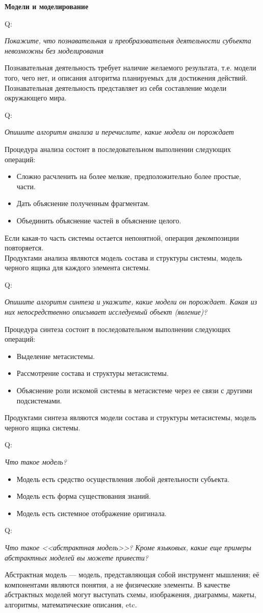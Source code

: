 \documentclass{article}
\renewcommand{\subsection}[1]{
	\vspace{2em}
	\begin{flushright}
		\large
		\textbf{#1}
	\end{flushright}
	}
\newcommand{\question}[2]{
	\begin{flushright}
		Q:\hspace{2ex}\vline\hspace{2ex}
		\begin{minipage}{0.9\textwidth}
			\large
			\textit{#1}
		\end{minipage}
	\end{flushright}
	\begin{center}
		\begin{minipage}{0.95\textwidth}
			#2
		\end{minipage}
	\end{center}
	}
\begin{document}
\subsection{Модели и моделирование}
\question{Покажите, что познавательная и преобразовательня деятельности субъекта невозможны без моделирования}{Познавательная деятельность требует наличие желаемого результата, т.е. модели того, чего нет, и описания алгоритма планируемых для достижения действий.\\Познавательная деятельность представляет из себя составление модели окружающего мира.}
\question{Опишите алгоритм анализа и перечислите, какие модели он порождает}{Процедура анализа состоит в последовательном выполнении следующих операций:
	\begin{itemize}
		\item Сложно расчленить на более мелкие, предположительно более простые, части.
		\item Дать объяснение полученным фрагментам.
		\item Объединить объяснение частей в объяснение целого.
	\end{itemize}
Если какая-то часть системы остается непонятной, операция декомпозиции повторяется.\\Продуктами анализа являются модель состава и структуры системы, модель черного ящика для каждого элемента системы.}
\question{Опишите алгоритм синтеза и укажите, какие модели он порождает. Какая из них непосредственно описывает исследуемый объект (явление)?}{Процедура синтеза состоит в последовательном выполнении следующих операций:
	\begin{itemize}
		\item Выделение метасистемы.
		\item Рассмотрение состава и структуры метасистемы.
		\item Объяснение роли искомой системы в метасистеме через ее связи с другими подсистемами.
	\end{itemize}
Продуктами синтеза являются модели состава и структуры метасистемы, модель черного ящика системы.}
\question{Что такое модель?}{
	\begin{itemize}
		\item Модель есть средство осуществления любой деятельности субъекта.
		\item Модель есть форма существования знаний.
		\item Модель есть системное отображение оригинала.
	\end{itemize}}
\question{Что такое <<абстрактная модель>>? Кроме языковых, какие еще примеры абстрактных моделей вы можете привести?}{Абстрактная модель --- модель, представляющая собой инструмент мышления; её компонентами являются понятия, а не физические элементы. В качестве абстрактных моделей могут выступать схемы, изображения, диаграммы, макеты, алгоритмы, математические описания, etc.}
\end{document}
